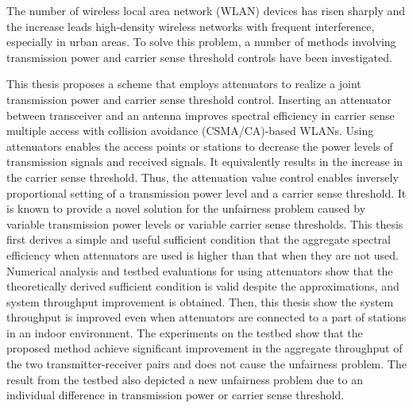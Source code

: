 \documentclass[master]{kuisthesis}		%
\begin{document}
\begin{eabstract}				%
 The number of  wireless local area network (WLAN) devices has risen sharply and the increase leads high-density wireless networks with frequent interference, especially in urban areas.
 To solve this problem, a number of methods involving transmission power and carrier sense threshold controls have been investigated.
 
 This thesis proposes a scheme that employs attenuators to realize a joint transmission power and carrier sense threshold control. Inserting an attenuator between transceiver and an antenna improves spectral efficiency in carrier sense multiple access with collision avoidance (CSMA/CA)-based WLANs.
 Using attenuators enables the access points or stations to decrease the power levels of transmission signals and received signals.
 It equivalently results in the increase in the carrier sense threshold.
 Thus, the attenuation value control enables inversely proportional setting of a transmission power level and a carrier sense threshold.
  It is known to provide a novel solution for the unfairness problem caused by variable transmission power levels or variable carrier sense thresholds.
 This thesis first derives a simple and useful sufficient condition that the aggregate spectral efficiency when attenuators are used is higher than that when they are not used.
 Numerical analysis and testbed evaluations for using attenuators show that the theoretically derived sufficient condition is valid despite the approximations, and system throughput improvement is obtained.
 Then, this thesis show the system throughput is improved even when attenuators are connected to a part of stations in an indoor environment.
 The experiments on the testbed show that the proposed method achieve significant improvement in the aggregate throughput of the two transmitter-receiver pairs and does not cause the unfairness problem.
 The result from the testbed also depicted a new unfairness problem due to an individual difference in transmission power or carrier sense threshold.

\end{eabstract}
\end{document}
